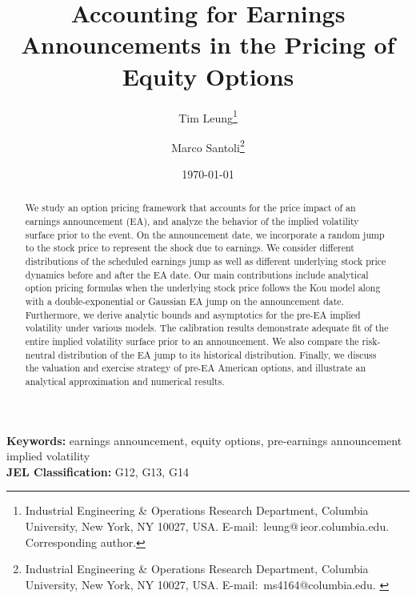 \documentclass[11pt]{article}
\numberwithin{equation}{section}
\numberwithin{theorem}{section}
\begin{document}
\title{Accounting for  Earnings Announcements in  the Pricing of \\
Equity Options}


\author{Tim Leung\thanks{{Industrial Engineering \& Operations Research Department, Columbia University, New York, NY 10027, USA. \mbox{E-mail: leung@\,ieor.columbia.edu}.
Corresponding author. }} \and Marco Santoli\thanks{{Industrial Engineering \& Operations Research Department, Columbia
University, New York, NY 10027, USA.   \mbox{E-mail: ms4164@columbia.edu}. 
} }}


\date{\today}

\maketitle



\begin{small}
\begin{abstract}
We study an option pricing framework that accounts for the price impact of an earnings announcement (EA), and analyze the behavior of the implied volatility surface prior to  the event. On the announcement date, we incorporate  a random jump to the stock price to represent the  shock due to earnings. We consider  different  distributions of the scheduled
earnings jump as well as different underlying stock price dynamics before and after the EA date.    Our main contributions include analytical option pricing formulas when the underlying stock price  follows the Kou model  along with a double-exponential or  Gaussian EA jump on the   announcement date.  Furthermore, we  derive  analytic  bounds and asymptotics for the pre-EA implied volatility   under various models.  The calibration results demonstrate adequate fit of the entire implied volatility surface prior to an announcement. We also compare  the risk-neutral  distribution of the EA jump  to its historical distribution. Finally, we discuss the valuation and exercise strategy of pre-EA American options, and illustrate an analytical approximation and numerical results.

 
\end{abstract}
 
\noindent \textbf{Keywords:} earnings announcement,  equity options,  pre-earnings announcement implied volatility  \\
 \textbf{JEL Classification:} G12, G13, G14

\tableofcontents
\end{small}
\end{document}
